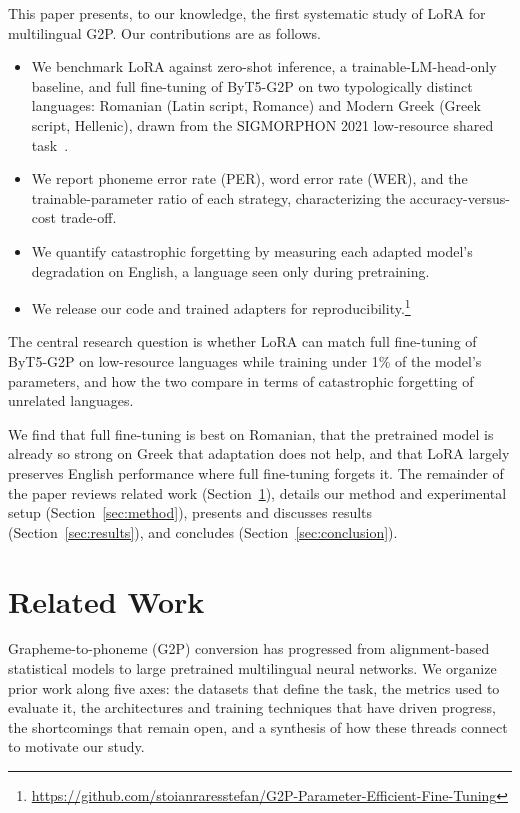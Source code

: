 \documentclass[conference]{IEEEtran}
\begin{document}
This paper presents, to our knowledge, the first systematic study of LoRA for multilingual G2P. Our contributions are as follows.
\begin{itemize}
\item We benchmark LoRA against zero-shot inference, a trainable-LM-head-only baseline, and full fine-tuning of ByT5-G2P on two typologically distinct languages: Romanian (Latin script, Romance) and Modern Greek (Greek script, Hellenic), drawn from the SIGMORPHON 2021 low-resource shared task~\cite{ashby2021}.
\item We report phoneme error rate (PER), word error rate (WER), and the trainable-parameter ratio of each strategy, characterizing the accuracy-versus-cost trade-off.
\item We quantify catastrophic forgetting by measuring each adapted model's degradation on English, a language seen only during pretraining.
\item We release our code and trained adapters for reproducibility.\footnote{\url{https://github.com/stoianraresstefan/G2P-Parameter-Efficient-Fine-Tuning}}
\end{itemize}

The central research question is whether LoRA can match full fine-tuning of ByT5-G2P on low-resource languages while training under 1\% of the model's parameters, and how the two compare in terms of catastrophic forgetting of unrelated languages.

We find that full fine-tuning is best on Romanian, that the pretrained model is already so strong on Greek that adaptation does not help, and that LoRA largely preserves English performance where full fine-tuning forgets it. The remainder of the paper reviews related work (Section~\ref{sec:related}), details our method and experimental setup (Section~\ref{sec:method}), presents and discusses results (Section~\ref{sec:results}), and concludes (Section~\ref{sec:conclusion}).

\section{Related Work}\label{sec:related}

Grapheme-to-phoneme (G2P) conversion has progressed from alignment-based statistical models to large pretrained multilingual neural networks. We organize prior work along five axes: the datasets that define the task, the metrics used to evaluate it, the architectures and training techniques that have driven progress, the shortcomings that remain open, and a synthesis of how these threads connect to motivate our study.
\end{document}
